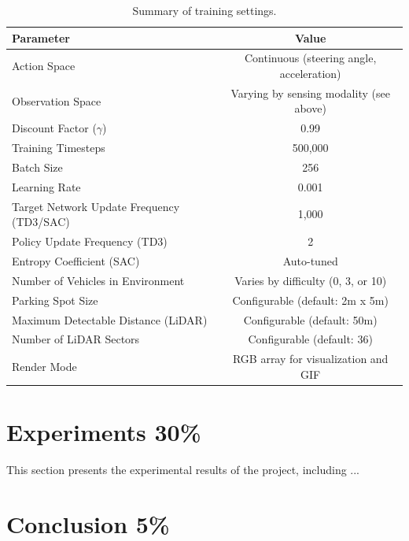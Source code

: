 \documentclass{article}
\begin{document}
\begin{table}[h]
    \centering
    \begin{tabular}{l|c}
        \hline
        \textbf{Parameter} & \textbf{Value} \\
        \hline
        Action Space & Continuous (steering angle, acceleration) \\
        Observation Space & Varying by sensing modality (see above) \\
        Discount Factor ($\gamma$) & 0.99 \\
        Training Timesteps & 500,000 \\
        Batch Size & 256 \\
        Learning Rate & 0.001 \\
        Target Network Update Frequency (TD3/SAC) & 1,000\\
        Policy Update Frequency (TD3) & 2 \\
        Entropy Coefficient (SAC) & Auto-tuned \\
        Number of Vehicles in Environment & Varies by difficulty (0, 3, or 10) \\
        Parking Spot Size & Configurable (default: 2m x 5m) \\
        Maximum Detectable Distance (LiDAR) & Configurable (default: 50m) \\
        Number of LiDAR Sectors & Configurable (default: 36) \\
        Render Mode & RGB array for visualization and GIF \\
        \hline
    \end{tabular}
    \caption{Summary of training settings.}
    \label{tab:training_settings}
\end{table}

\section{Experiments 30\%}\label{sec:experiments}

This section presents the experimental results of the project, including ...

\section{Conclusion 5\%}\label{sec:conclusion}
\end{document}
